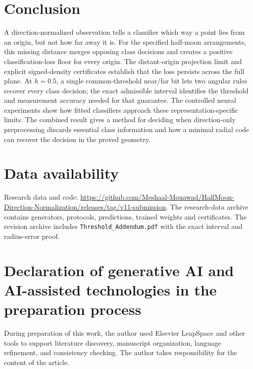 \documentclass[a4paper,fleqn]{cas-dc}
\begin{document}
\section{Conclusion}
A direction-normalized observation tells a classifier which way a point lies from an origin, but not how far away it is. For the specified half-moon arrangements, this missing distance merges opposing class decisions and creates a positive classification-loss floor for every origin. The distant-origin projection limit and explicit signed-density certificates establish that the loss persists across the full plane. At $h=0.5$, a single common-threshold near/far bit lets two angular rules recover every class decision; the exact admissible interval identifies the threshold and measurement accuracy needed for that guarantee. The controlled neural experiments show how fitted classifiers approach these representation-specific limits. The combined result gives a method for deciding when direction-only preprocessing discards essential class information and how a minimal radial code can recover the decision in the proved geometry.

\section*{Data availability}
Research data and code: \url{https://github.com/Meshaal-Mouawad/HalfMoon-Direction-Normalization/releases/tag/v11-submission}. The research-data archive contains generators, protocols, predictions, trained weights and certificates. The revision archive includes \texttt{Threshold\_Addendum.pdf} with the exact interval and radius-error proof.
\section*{Declaration of generative AI and AI-assisted technologies in the preparation process}
During preparation of this work, the author used Elsevier LeapSpace and other tools to support literature discovery, manuscript organization, language refinement, and consistency checking. The author takes responsibility for the content of the article.


\end{document}

